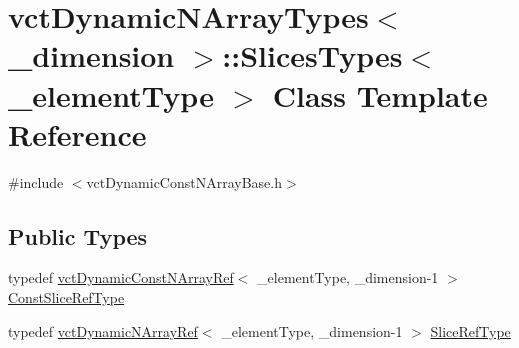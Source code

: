 \hypertarget{classvct_dynamic_n_array_types_1_1_slices_types}{}\section{vct\+Dynamic\+N\+Array\+Types$<$ \+\_\+dimension $>$\+:\+:Slices\+Types$<$ \+\_\+element\+Type $>$ Class Template Reference}
\label{classvct_dynamic_n_array_types_1_1_slices_types}


{\ttfamily \#include $<$vct\+Dynamic\+Const\+N\+Array\+Base.\+h$>$}

\subsection*{Public Types}
\begin{DoxyCompactItemize}
\item 
typedef \hyperlink{classvct_dynamic_const_n_array_ref}{vct\+Dynamic\+Const\+N\+Array\+Ref}$<$ \+\_\+element\+Type, \+\_\+dimension-\/1 $>$ \hyperlink{classvct_dynamic_n_array_types_1_1_slices_types_acf1ea70846d0d2739fce728d3c99bde3}{Const\+Slice\+Ref\+Type}
\item 
typedef \hyperlink{classvct_dynamic_n_array_ref}{vct\+Dynamic\+N\+Array\+Ref}$<$ \+\_\+element\+Type, \+\_\+dimension-\/1 $>$ \hyperlink{classvct_dynamic_n_array_types_1_1_slices_types_a3eac136f0c4ca03f30cf55cdd608ebf8}{Slice\+Ref\+Type}
\end{DoxyCompactItemize}
